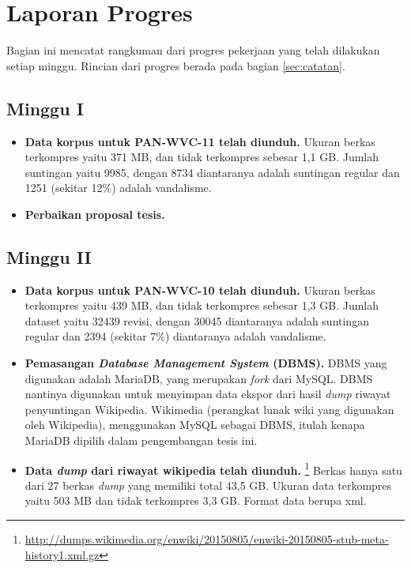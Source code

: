 





\tableofcontents

\section{Laporan Progres}

Bagian ini mencatat rangkuman dari progres pekerjaan yang telah dilakukan setiap minggu.
Rincian dari progres berada pada bagian \ref{sec:catatan}.

\subsection{Minggu I}

\begin{itemize}
	\item \textbf{Data korpus untuk PAN-WVC-11 telah diunduh.}
Ukuran berkas terkompres yaitu 371 MB, dan tidak terkompres sebesar 1,1 GB.
Jumlah suntingan yaitu 9985, dengan 8734 diantaranya adalah suntingan regular dan 1251 (sekitar 12\%) adalah vandalisme.

	\item \textbf{Perbaikan proposal tesis.}
\end{itemize}

\subsection{Minggu II}

\begin{itemize}
	\item \textbf{Data korpus untuk PAN-WVC-10 telah diunduh.}
Ukuran berkas terkompres yaitu 439 MB, dan tidak terkompres sebesar 1,3 GB.
Jumlah dataset yaitu 32439 revisi, dengan 30045 diantaranya adalah suntingan regular dan 2394 (sekitar 7\%) diantaranya adalah vandalisme.

	\item \textbf{Pemasangan \textit{Database Management System} (DBMS).}
DBMS yang digunakan adalah MariaDB, yang merupakan \textit{fork} dari MySQL.
DBMS nantinya digunakan untuk menyimpan data ekspor dari hasil \textit{dump} riwayat penyuntingan Wikipedia.
Wikimedia (perangkat lunak wiki yang digunakan oleh Wikipedia), menggunakan MySQL sebagai DBMS, itulah kenapa MariaDB dipilih dalam pengembangan tesis ini.

	\item \textbf{Data \textit{dump} dari riwayat wikipedia telah diunduh.} \footnote{\RaggedRight\url{http://dumps.wikimedia.org/enwiki/20150805/enwiki-20150805-stub-meta-history1.xml.gz}}
Berkas hanya satu dari 27 berkas \textit{dump} yang memiliki total 43,5 GB.
Ukuran data terkompres yaitu 503 MB dan tidak terkompres 3,3 GB.
Format data berupa xml.
\end{itemize}

